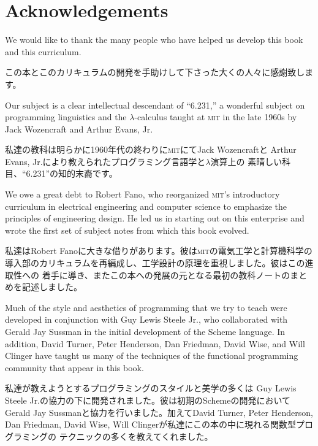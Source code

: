 \documentclass[oneside]{book}
\newcommand{\acronym}[1]{\textsc{\MakeLowercase{#1}}}
\begin{document}
\label{Acknowledgements}
\chapter*{Acknowledgements}

We would like to thank the many people who have helped us develop this book and
this curriculum.

この本とこのカリキュラムの開発を手助けして下さった大くの人々に感謝致します。

Our subject is a clear intellectual descendant of ``6.231,'' a wonderful
subject on programming linguistics and the \( \lambda \)-calculus taught at
\acronym{MIT} in the late 1960s by Jack Wozencraft and Arthur Evans, Jr.

私達の教科は明らかに1960年代の終わりに\acronym{MIT}にてJack Wozencraftと
Arthur Evans, Jr.により教えられたプログラミング言語学と\( \lambda \)演算上の
素晴しい科目、``6.231''の知的末裔です。

We owe a great debt to Robert Fano, who reorganized \acronym{MIT}'s
introductory curriculum in electrical engineering and computer science to
emphasize the principles of engineering design.  He led us in starting out on
this enterprise and wrote the first set of subject notes from which this book
evolved.

私達はRobert Fanoに大きな借りがあります。彼は\acronym{MIT}の電気工学と計算機科学の
導入部のカリキュラムを再編成し、工学設計の原理を重視しました。彼はこの進取性への
着手に導き、またこの本への発展の元となる最初の教科ノートのまとめを記述しました。

Much of the style and aesthetics of programming that we try to teach were
developed in conjunction with Guy Lewis Steele Jr., who collaborated with
Gerald Jay Sussman in the initial development of the Scheme language.  In
addition, David Turner, Peter Henderson, Dan Friedman, David Wise, and Will
Clinger have taught us many of the techniques of the functional programming
community that appear in this book.

私達が教えようとするプログラミングのスタイルと美学の多くは
Guy Lewis Steele Jr.の協力の下に開発されました。彼は初期のSchemeの開発において
Gerald Jay Sussmanと協力を行いました。加えてDavid Turner, Peter Henderson, 
Dan Friedman, David Wise, Will Clingerが私達にこの本の中に現れる関数型プログラミングの
テクニックの多くを教えてくれました。
\end{document}
